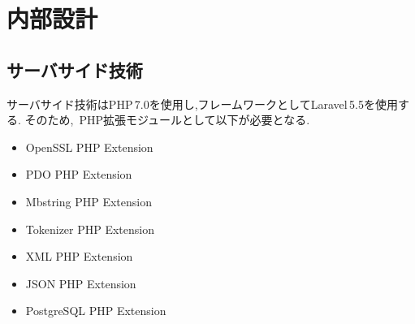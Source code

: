 \documentclass[a4paper]{ltjsarticle}
\begin{document}
\clearpage

\section{内部設計}
    \subsection{サーバサイド技術}
        サーバサイド技術はPHP\,7.0を使用し,フレームワークとしてLaravel\,5.5を使用する.
        そのため,\, PHP拡張モジュールとして以下が必要となる.
        \begin{itemize}
            \item OpenSSL PHP Extension
            \item PDO PHP Extension
            \item Mbstring PHP Extension
            \item Tokenizer PHP Extension
            \item XML PHP Extension
            \item JSON PHP Extension
            \item PostgreSQL PHP Extension
        \end{itemize}
\end{document}
